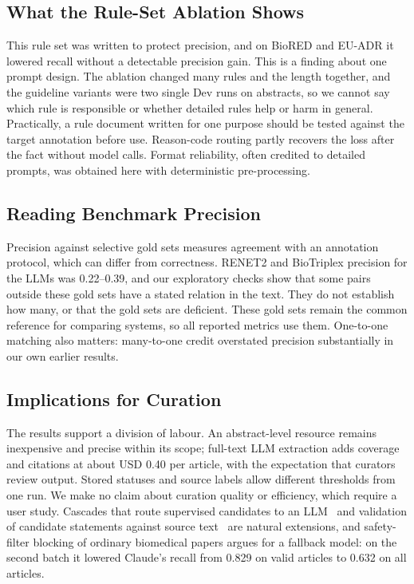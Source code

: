 \documentclass[preprint,10pt,letterpaper]{elsarticle}
\begin{document}
\subsection{What the Rule-Set Ablation Shows}
This rule set was written to protect precision, and on BioRED and EU-ADR it lowered recall without a detectable precision gain. This is a finding about one prompt design. The ablation changed many rules and the length together, and the guideline variants were two single Dev runs on abstracts, so we cannot say which rule is responsible or whether detailed rules help or harm in general. Practically, a rule document written for one purpose should be tested against the target annotation before use. Reason-code routing partly recovers the loss after the fact without model calls. Format reliability, often credited to detailed prompts, was obtained here with deterministic pre-processing.

\subsection{Reading Benchmark Precision}
Precision against selective gold sets measures agreement with an annotation protocol, which can differ from correctness. RENET2 and BioTriplex precision for the LLMs was 0.22--0.39, and our exploratory checks show that some pairs outside these gold sets have a stated relation in the text. They do not establish how many, or that the gold sets are deficient. These gold sets remain the common reference for comparing systems, so all reported metrics use them. One-to-one matching also matters: many-to-one credit overstated precision substantially in our own earlier results.

\subsection{Implications for Curation}
The results support a division of labour. An abstract-level resource remains inexpensive and precise within its scope; full-text LLM extraction adds coverage and citations at about USD 0.40 per article, with the expectation that curators review output. Stored statuses and source labels allow different thresholds from one run. We make no claim about curation quality or efficiency, which require a user study. Cascades that route supervised candidates to an LLM~\cite{song2026core} and validation of candidate statements against source text~\cite{adam2025traceable} are natural extensions, and safety-filter blocking of ordinary biomedical papers argues for a fallback model: on the second batch it lowered Claude's recall from 0.829 on valid articles to 0.632 on all articles.
\end{document}
